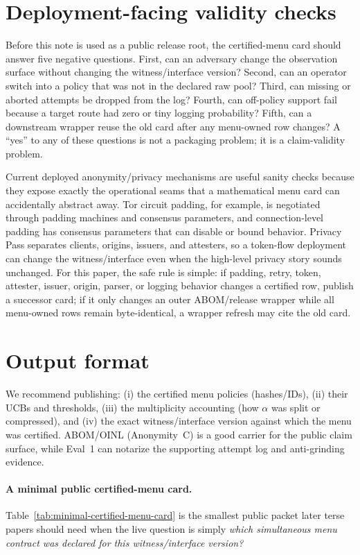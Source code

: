 \documentclass[11pt]{article}
\begin{document}
\section{Deployment-facing validity checks}
Before this note is used as a public release root, the certified-menu card should answer five negative questions.
First, can an adversary change the observation surface without changing the witness/interface version?
Second, can an operator switch into a policy that was not in the declared raw pool?
Third, can missing or aborted attempts be dropped from the log?
Fourth, can off-policy support fail because a target route had zero or tiny logging probability?
Fifth, can a downstream wrapper reuse the old card after any menu-owned row changes?
A ``yes'' to any of these questions is not a packaging problem; it is a claim-validity problem.

Current deployed anonymity/privacy mechanisms are useful sanity checks because they expose exactly the operational seams that a mathematical menu card can accidentally abstract away.
Tor circuit padding, for example, is negotiated through padding machines and consensus parameters, and connection-level padding has consensus parameters that can disable or bound behavior.\cite{torpadding,torconnectionpadding}
Privacy Pass separates clients, origins, issuers, and attesters, so a token-flow deployment can change the witness/interface even when the high-level privacy story sounds unchanged.\cite{privacypass9576,privacypass9577}
For this paper, the safe rule is simple: if padding, retry, token, attester, issuer, origin, parser, or logging behavior changes a certified row, publish a successor card; if it only changes an outer ABOM/release wrapper while all menu-owned rows remain byte-identical, a wrapper refresh may cite the old card.

\section{Output format}
We recommend publishing:
(i) the certified menu policies (hashes/IDs),
(ii) their UCBs and thresholds,
(iii) the multiplicity accounting (how $\alpha$ was split or compressed), and
(iv) the exact witness/interface version against which the menu was certified.
ABOM/OINL (Anonymity~C) is a good carrier for the public claim surface, while Eval~1 can notarize the supporting attempt log and anti-grinding evidence.\cite{series:abomoinl,series:eval1}

\paragraph{A minimal public certified-menu card.}
Table~\ref{tab:minimal-certified-menu-card} is the smallest public packet later terse papers should need when the live question is simply \emph{which simultaneous menu contract was declared for this witness/interface version?}
\end{document}
